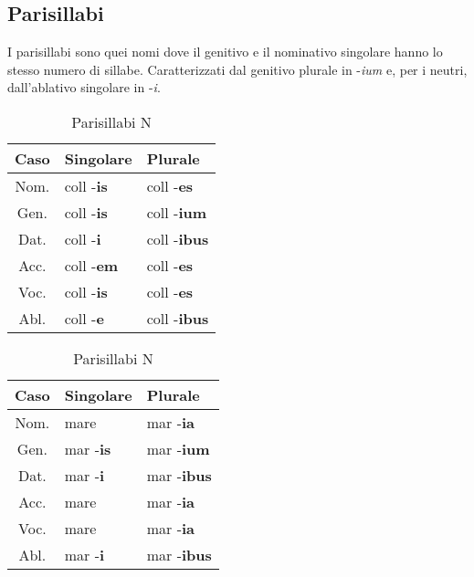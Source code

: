 \subsection{Parisillabi}
I parisillabi sono quei nomi dove il genitivo e il nominativo singolare hanno lo stesso numero di sillabe.
Caratterizzati dal genitivo plurale in -\textit{ium} e, per i neutri, dall'ablativo singolare in -\textit{i}.
\begin{table}[h!]
    \begin{minipage}{.4\linewidth}
        \centering
        \begin{tabular}{|c|l|l|}
            \hline
            \textbf{Caso} & \textbf{Singolare} & \textbf{Plurale} \\
            \hline
            Nom. & coll -\textbf{is} & coll -\textbf{es} \\
            \hline
            Gen. & coll -\textbf{is} & coll -\textbf{ium} \\
            \hline
            Dat. & coll -\textbf{i}  & coll -\textbf{ibus} \\
            \hline
            Acc. & coll -\textbf{em} & coll -\textbf{es} \\
            \hline
            Voc. & coll -\textbf{is} & coll -\textbf{es} \\
            \hline
            Abl. & coll -\textbf{e}  & coll -\textbf{ibus} \\
            \hline
        \end{tabular}
        \caption{Parisillabi M \& F}
    \end{minipage}
    \hfill
    \begin{minipage}{.4\linewidth}
        \centering
        \begin{tabular}{|c|l|l|}
            \hline
            \textbf{Caso} & \textbf{Singolare} & \textbf{Plurale} \\
            \hline
            Nom. & mare             & mar -\textbf{ia} \\
            \hline
            Gen. & mar -\textbf{is} & mar -\textbf{ium} \\
            \hline
            Dat. & mar -\textbf{i}  & mar -\textbf{ibus} \\
            \hline
            Acc. & mare             & mar -\textbf{ia} \\
            \hline
            Voc. & mare             & mar -\textbf{ia} \\
            \hline
            Abl. & mar -\textbf{i}  & mar -\textbf{ibus} \\
            \hline
        \end{tabular}
        \caption{Parisillabi N}
    \end{minipage}
\end{table}

